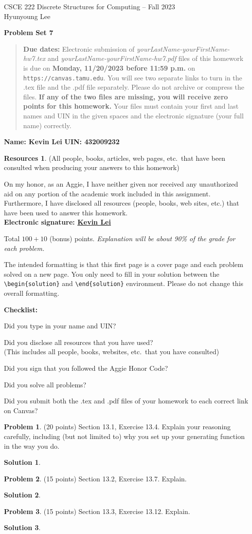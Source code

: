 \documentclass{article}
\theoremstyle{definition}
\newtheorem{problem}{Problem}
\newtheorem*{solution}{Solution}
\newtheorem*{resources}{Resources}
\newcommand{\name}[2]{\noindent\textbf{Name: #1}\hfill \textbf{UIN: #2}
  \newcommand{\myName}{#1}
  \newcommand{\myUIN}{#2}
}
\newcommand{\honor}{\noindent On my honor, as an Aggie, I have neither
  given nor received any unauthorized aid on any portion of the
  academic work included in this assignment. Furthermore, I have
  disclosed all resources (people, books, web sites, etc.) that have
  been used to answer this homework. \\[2ex]
 \textbf{Electronic signature: \underline{ Kevin Lei } } } %
\newcommand{\checklist}{\noindent\textbf{Checklist:}
\begin{compactitem}[$\Box$] 
\item Did you type in your name and UIN? 
\item Did you disclose all resources that you have used? \\
(This includes all people, books, websites, etc.\ that you have consulted)
\item Did you sign that you followed the Aggie Honor Code? 
\item Did you solve all problems? 
\item Did you submit both the .tex and .pdf files of your homework to each correct link 
on Canvas? 
\end{compactitem}
}
\newcommand{\problemset}[1]{\begin{center}\textbf{Problem Set #1}\end{center}}
\newcommand{\duedate}[1]{\begin{quote}\textbf{Due dates:} Electronic
    submission of \textsl{yourLastName-yourFirstName-hw7.tex} and 
    \textsl{yourLastName-yourFirstName-hw7.pdf} files of this homework is due on
    \textbf{#1} on \texttt{https://canvas.tamu.edu}. You will see two separate links
    to turn in the .tex file and the .pdf file separately. Please do not archive or compress the files.  
    \textbf{If any of the two files are missing, you will receive zero points for this homework.}
    Your files must contain your first and last names and UIN in the given spaces and 
    the electronic signature (your full name) correctly.\end{quote} }
\begin{document}
\begin{center}
{\large
CSCE 222 Discrete Structures for Computing -- Fall 2023\\[.5ex]
Hyunyoung Lee\\}
\end{center}
\problemset{7}
\duedate{Monday, 11/20/2023 before 11:59 p.m.}
\name{ Kevin Lei }{ 432009232 } %

\begin{resources} (All people, books, articles, web pages, etc.\ that
  have been consulted when producing your answers to this homework)
\end{resources}
\honor

\bigskip

\noindent
Total $100+10$ (bonus) points.  \textit{Explanation will be about 90\% of the grade 
for each problem.}

\bigskip

\noindent
The intended formatting is that this first page is a cover page and each 
problem solved on a new page. You only need to fill in your solution between 
the \verb|\begin{solution}| and \verb|\end{solution}| environment.  
Please do not change this overall formatting.

\vfill
\checklist

\newpage
\begin{problem} (20 points) Section 13.1, Exercise 13.4. Explain your reasoning 
carefully, including (but not limited to) why you set up your generating function 
in the way you do.
\end{problem}
\begin{solution}
\end{solution}

\newpage
\begin{problem} (15 points) Section 13.2, Exercise 13.7. Explain.
\end{problem}
\begin{solution}
\end{solution}

\newpage
\begin{problem} (15 points) Section 13.3, Exercise 13.12. Explain.
\end{problem}
\begin{solution}
\end{solution}
\end{document}
